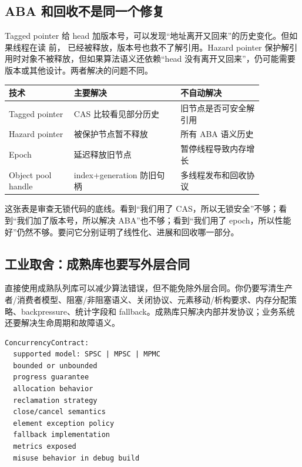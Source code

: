 \subsection{ABA 和回收不是同一个修复}

Tagged pointer 给 head 加版本号，可以发现“地址离开又回来”的历史变化。但如果线程在读  前， 已经被释放，版本号也救不了解引用。Hazard pointer 保护解引用时对象不被释放，但如果算法语义还依赖“head 没有离开又回来”，仍可能需要版本或其他设计。两者解决的问题不同。

\begin{center}
\begin{tabular}{p{0.22\linewidth}p{0.36\linewidth}p{0.28\linewidth}}
\toprule
技术 & 主要解决 & 不自动解决 \\
\midrule
Tagged pointer & CAS 比较看见部分历史 & 旧节点是否可安全解引用 \\
Hazard pointer & 被保护节点暂不释放 & 所有 ABA 语义历史 \\
Epoch & 延迟释放旧节点 & 暂停线程导致内存增长 \\
Object pool handle & index+generation 防旧句柄 & 多线程发布和回收协议 \\
\bottomrule
\end{tabular}
\end{center}

这张表是审查无锁代码的底线。看到“我们用了 CAS，所以无锁安全”不够；看到“我们加了版本号，所以解决 ABA”也不够；看到“我们用了 epoch，所以性能好”仍然不够。要问它分别证明了线性化、进展和回收哪一部分。

\subsection{工业取舍：成熟库也要写外层合同}

直接使用成熟队列库可以减少算法错误，但不能免除外层合同。你仍要写清生产者/消费者模型、阻塞/非阻塞语义、关闭协议、元素移动/析构要求、内存分配策略、backpressure、统计字段和 fallback。成熟库只解决内部并发协议；业务系统还要解决生命周期和故障语义。

\begin{lstlisting}[numbers=none,caption={无锁结构引入前的审查单}]
ConcurrencyContract:
  supported model: SPSC | MPSC | MPMC
  bounded or unbounded
  progress guarantee
  allocation behavior
  reclamation strategy
  close/cancel semantics
  element exception policy
  fallback implementation
  metrics exposed
  misuse behavior in debug build
\end{lstlisting}

